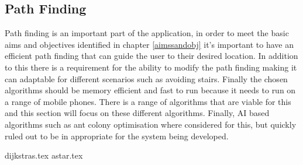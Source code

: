 \subsection{Path Finding}
Path finding is an important part of the application, in order to meet the basic aims and objectives identified in chapter \ref{aimssandobj} it's important to have an efficient path finding that can guide the user to their desired location. In addition to this there is a requirement for the ability to modify the path finding making it can adaptable for different scenarios such as avoiding stairs. Finally the chosen algorithms should be memory efficient and fast to run because it needs to run on a range of mobile phones. There is a range of algorithms that are viable for this and this section will focus on these different algorithms. Finally, AI based algorithms such as ant colony optimisation where considered for this, but quickly ruled out to be in appropriate for the system being developed.

{dijkstras.tex}
{astar.tex}